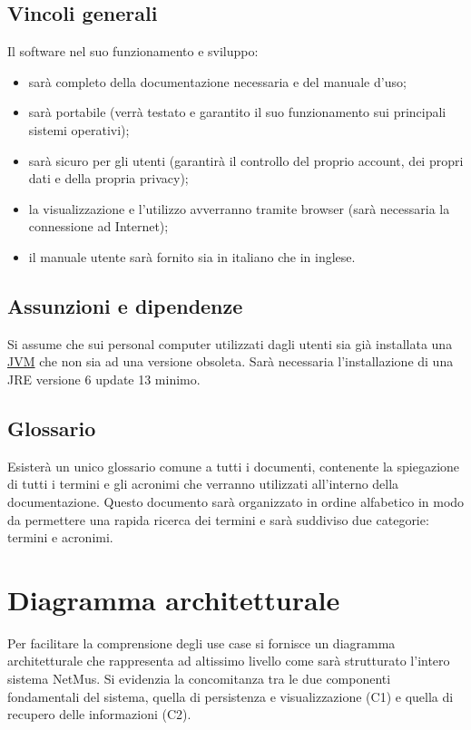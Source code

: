 \section{Vincoli generali}
Il software nel suo funzionamento e sviluppo:
\begin{itemize}
  \item sar\`a completo della documentazione necessaria e del manuale d'uso;
  \item sar\`a portabile (verr\`a testato e garantito il suo funzionamento sui
  principali sistemi operativi);
  \item sar\`a sicuro per gli utenti (garantir\`a il controllo del proprio
  account, dei propri dati e della propria privacy);
  \item la visualizzazione e l'utilizzo avverranno tramite browser (sar\`a
  necessaria la connessione ad Internet);
  \item il manuale utente sar\`a fornito sia in italiano che in inglese.
\end{itemize}

\section{Assunzioni e dipendenze}
Si assume che sui personal computer utilizzati dagli utenti sia gi\`a installata
una \underline{JVM} che non sia ad una versione obsoleta. Sar\`a
necessaria l'installazione di una JRE  versione 6 update 13 minimo.

\section{Glossario}
Esister\`a un unico glossario comune a tutti i documenti, contenente la
spiegazione di tutti i termini e gli acronimi che verranno utilizzati
all'interno della documentazione. Questo documento sar\`a organizzato in ordine
alfabetico in modo da permettere una rapida ricerca dei termini e sar\`a suddiviso
due categorie: termini e acronimi.

\chapter{Diagramma architetturale}
\thispagestyle{fancy}
Per facilitare la comprensione degli use case si fornisce un diagramma
architetturale che rappresenta ad altissimo livello come sar\`a strutturato
l'intero sistema NetMus. Si evidenzia la concomitanza tra le due componenti fondamentali
del sistema, quella di persistenza e visualizzazione (C1) e quella di
recupero delle informazioni (C2).
\vspace{1cm}

